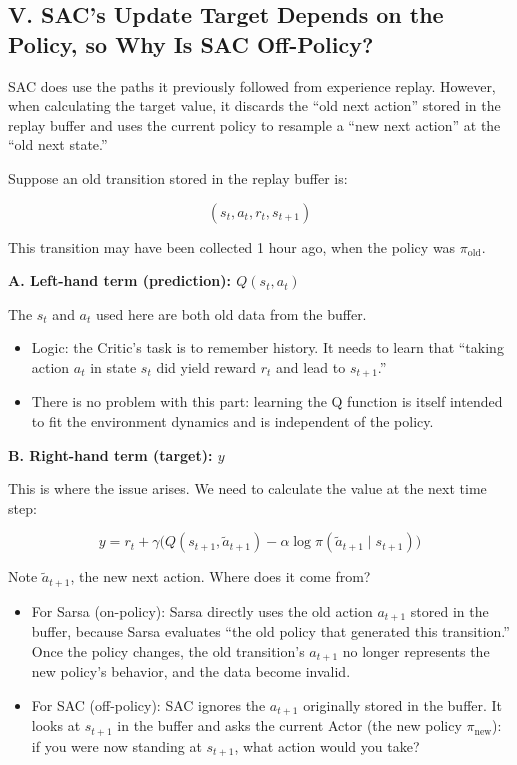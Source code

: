 \hypertarget{v.-sacs-update-target-depends-on-the-policy-so-why-is-sac-off-policy}{%
\subsection{V. SAC's Update Target Depends on the Policy, so Why Is SAC Off-Policy?}\label{v.-sacs-update-target-depends-on-the-policy-so-why-is-sac-off-policy}}

SAC does use the paths it previously followed from experience replay. However, when calculating the target value, it discards the ``old next action'' stored in the replay buffer and uses the current policy to resample a ``new next action'' at the ``old next state.''

Suppose an old transition stored in the replay buffer is:

\[
(s_t,a_t,r_t,s_{t+1})
\]

This transition may have been collected 1 hour ago, when the policy was \(\pi_{\mathrm{old}}\).

\textbf{A. Left-hand term (prediction): \(Q(s_t,a_t)\)}

The \(s_t\) and \(a_t\) used here are both old data from the buffer.

\begin{itemize}
\tightlist
\item
  Logic: the Critic's task is to remember history. It needs to learn that ``taking action \(a_t\) in state \(s_t\) did yield reward \(r_t\) and lead to \(s_{t+1}\).''
\item
  There is no problem with this part: learning the Q function is itself intended to fit the environment dynamics and is independent of the policy.
\end{itemize}

\textbf{B. Right-hand term (target): \(y\)}

This is where the issue arises. We need to calculate the value at the next time step:

\[
y
=
r_t
+
\gamma
\bigl(
Q(s_{t+1},\tilde{a}_{t+1})
-
\alpha\log\pi(\tilde{a}_{t+1}\mid s_{t+1})
\bigr)
\]

Note \(\tilde{a}_{t+1}\), the new next action. Where does it come from?

\begin{itemize}
\tightlist
\item
  For Sarsa (on-policy): Sarsa directly uses the old action \(a_{t+1}\) stored in the buffer, because Sarsa evaluates ``the old policy that generated this transition.'' Once the policy changes, the old transition's \(a_{t+1}\) no longer represents the new policy's behavior, and the data become invalid.
\item
  For SAC (off-policy): SAC ignores the \(a_{t+1}\) originally stored in the buffer. It looks at \(s_{t+1}\) in the buffer and asks the current Actor (the new policy \(\pi_{\mathrm{new}}\)): if you were now standing at \(s_{t+1}\), what action would you take?
\end{itemize}

